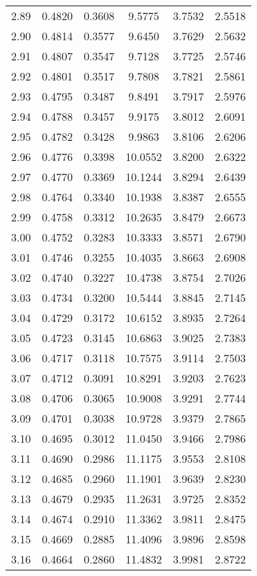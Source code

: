 \documentclass{article}
\begin{document}
\begin{longtable}{cccccc}
2.89 & 0.4820 & 0.3608 & 9.5775 & 3.7532 & 2.5518 \\
2.90 & 0.4814 & 0.3577 & 9.6450 & 3.7629 & 2.5632 \\
2.91 & 0.4807 & 0.3547 & 9.7128 & 3.7725 & 2.5746 \\
2.92 & 0.4801 & 0.3517 & 9.7808 & 3.7821 & 2.5861 \\
2.93 & 0.4795 & 0.3487 & 9.8491 & 3.7917 & 2.5976 \\
2.94 & 0.4788 & 0.3457 & 9.9175 & 3.8012 & 2.6091 \\
2.95 & 0.4782 & 0.3428 & 9.9863 & 3.8106 & 2.6206 \\
2.96 & 0.4776 & 0.3398 & 10.0552 & 3.8200 & 2.6322 \\
2.97 & 0.4770 & 0.3369 & 10.1244 & 3.8294 & 2.6439 \\
2.98 & 0.4764 & 0.3340 & 10.1938 & 3.8387 & 2.6555 \\
2.99 & 0.4758 & 0.3312 & 10.2635 & 3.8479 & 2.6673 \\
3.00 & 0.4752 & 0.3283 & 10.3333 & 3.8571 & 2.6790 \\
3.01 & 0.4746 & 0.3255 & 10.4035 & 3.8663 & 2.6908 \\
3.02 & 0.4740 & 0.3227 & 10.4738 & 3.8754 & 2.7026 \\
3.03 & 0.4734 & 0.3200 & 10.5444 & 3.8845 & 2.7145 \\
3.04 & 0.4729 & 0.3172 & 10.6152 & 3.8935 & 2.7264 \\
3.05 & 0.4723 & 0.3145 & 10.6863 & 3.9025 & 2.7383 \\
3.06 & 0.4717 & 0.3118 & 10.7575 & 3.9114 & 2.7503 \\
3.07 & 0.4712 & 0.3091 & 10.8291 & 3.9203 & 2.7623 \\
3.08 & 0.4706 & 0.3065 & 10.9008 & 3.9291 & 2.7744 \\
3.09 & 0.4701 & 0.3038 & 10.9728 & 3.9379 & 2.7865 \\
3.10 & 0.4695 & 0.3012 & 11.0450 & 3.9466 & 2.7986 \\
3.11 & 0.4690 & 0.2986 & 11.1175 & 3.9553 & 2.8108 \\
3.12 & 0.4685 & 0.2960 & 11.1901 & 3.9639 & 2.8230 \\
3.13 & 0.4679 & 0.2935 & 11.2631 & 3.9725 & 2.8352 \\
3.14 & 0.4674 & 0.2910 & 11.3362 & 3.9811 & 2.8475 \\
3.15 & 0.4669 & 0.2885 & 11.4096 & 3.9896 & 2.8598 \\
3.16 & 0.4664 & 0.2860 & 11.4832 & 3.9981 & 2.8722 \\

\end{longtable}
\end{document}

